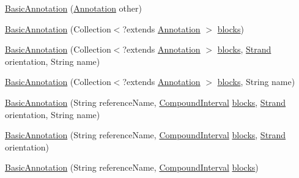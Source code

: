 \begin{DoxyCompactItemize}
\item 
\hyperlink{classumms_1_1core_1_1annotation_1_1_basic_annotation_afaf3ad7720218965777910c748b6c977}{Basic\+Annotation} (\hyperlink{interfaceumms_1_1core_1_1annotation_1_1_annotation}{Annotation} other)
\item 
\hyperlink{classumms_1_1core_1_1annotation_1_1_basic_annotation_a19a530b4546b04f66d6ca2ef86ff7d6b}{Basic\+Annotation} (Collection$<$?extends \hyperlink{interfaceumms_1_1core_1_1annotation_1_1_annotation}{Annotation} $>$ \hyperlink{classumms_1_1core_1_1annotation_1_1_basic_annotation_a8d54dfeeeaf679fd40a2c3bb5a2db3e0}{blocks})
\item 
\hyperlink{classumms_1_1core_1_1annotation_1_1_basic_annotation_a16b0c7f8ee54c3c61e259fe2c9f42c37}{Basic\+Annotation} (Collection$<$?extends \hyperlink{interfaceumms_1_1core_1_1annotation_1_1_annotation}{Annotation} $>$ \hyperlink{classumms_1_1core_1_1annotation_1_1_basic_annotation_a8d54dfeeeaf679fd40a2c3bb5a2db3e0}{blocks}, \hyperlink{enumumms_1_1core_1_1annotation_1_1_annotation_1_1_strand}{Strand} orientation, String name)
\item 
\hyperlink{classumms_1_1core_1_1annotation_1_1_basic_annotation_a11b6c255f0797b3cfc4a88085a5ff6f1}{Basic\+Annotation} (Collection$<$?extends \hyperlink{interfaceumms_1_1core_1_1annotation_1_1_annotation}{Annotation} $>$ \hyperlink{classumms_1_1core_1_1annotation_1_1_basic_annotation_a8d54dfeeeaf679fd40a2c3bb5a2db3e0}{blocks}, String name)
\item 
\hyperlink{classumms_1_1core_1_1annotation_1_1_basic_annotation_a080d7609e811ecc3588f18161223b588}{Basic\+Annotation} (String reference\+Name, \hyperlink{classumms_1_1core_1_1annotation_1_1_compound_interval}{Compound\+Interval} \hyperlink{classumms_1_1core_1_1annotation_1_1_basic_annotation_a8d54dfeeeaf679fd40a2c3bb5a2db3e0}{blocks}, \hyperlink{enumumms_1_1core_1_1annotation_1_1_annotation_1_1_strand}{Strand} orientation, String name)
\item 
\hyperlink{classumms_1_1core_1_1annotation_1_1_basic_annotation_afb1d4e6e52901c8ea9f360826606efb3}{Basic\+Annotation} (String reference\+Name, \hyperlink{classumms_1_1core_1_1annotation_1_1_compound_interval}{Compound\+Interval} \hyperlink{classumms_1_1core_1_1annotation_1_1_basic_annotation_a8d54dfeeeaf679fd40a2c3bb5a2db3e0}{blocks}, \hyperlink{enumumms_1_1core_1_1annotation_1_1_annotation_1_1_strand}{Strand} orientation)
\item 
\hyperlink{classumms_1_1core_1_1annotation_1_1_basic_annotation_a48002563143fd49a031d80765658b309}{Basic\+Annotation} (String reference\+Name, \hyperlink{classumms_1_1core_1_1annotation_1_1_compound_interval}{Compound\+Interval} \hyperlink{classumms_1_1core_1_1annotation_1_1_basic_annotation_a8d54dfeeeaf679fd40a2c3bb5a2db3e0}{blocks})

\end{DoxyCompactItemize}
